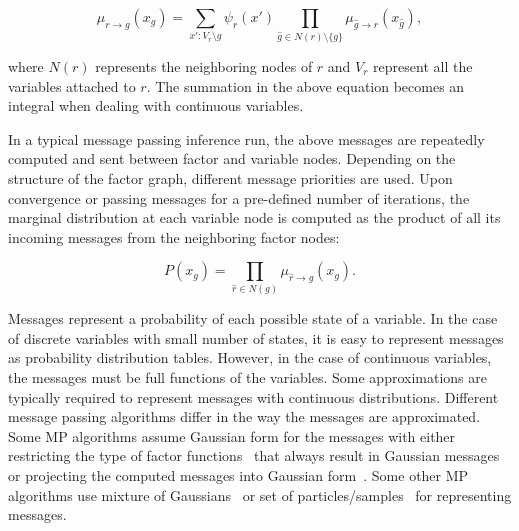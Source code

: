 \begin{equation}
\mu _{r\to g}(x_g)=\sum _{x':V_{r}\setminus g} \psi_{r}(x')\prod_{\hat{g}\in
N(r)\setminus \{g\}}\mu _{\hat{g}\to r}(x_{\hat{g}}),
\end{equation}

where $N(r)$ represents the neighboring nodes of $r$ and $V_r$ represent all the variables
attached to $r$. The summation in the above equation becomes an integral when
dealing with continuous variables.

In a typical message passing inference run, the above messages are repeatedly computed
and sent between factor and variable nodes. Depending on the structure of the factor graph,
different message priorities are used. Upon convergence or passing messages for a
pre-defined number of iterations, the marginal distribution at each variable node is
computed as the product of all its incoming messages from the neighboring factor nodes:

\begin{equation}
P(x_g) = \prod_{\hat{r}\in N(g)} \mu_{\hat{r} \rightarrow g}(x_g).
\end{equation}

Messages represent a probability of each possible state of a variable.
In the case of discrete variables with small number of states, it is easy to represent
messages as probability distribution tables. However, in the case of continuous variables,
the messages must be full functions of the variables. Some approximations are typically
required to represent messages with continuous distributions.
Different message passing algorithms differ in the way the messages are approximated.
Some MP algorithms assume Gaussian form for the messages with either restricting
the type of factor functions~\cite{weiss2001correctness} that always result in Gaussian messages or
projecting the computed messages into Gaussian form~\cite{Minka2001}.
Some other MP algorithms use mixture of Gaussians~\cite{sudderth2010nonparametric} or set of
particles/samples~\cite{ihler2009particle} for representing messages.


